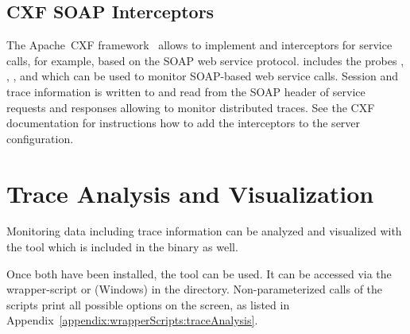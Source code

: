 \subsection{CXF SOAP Interceptors}\label{sec:traceAnalysis:instr:cxf}

The Apache~CXF framework~\cite{CXF-WebSite} allows to implement and interceptors for service calls, %
for example, based on the SOAP web service protocol. %
\Kieker{} includes the probes %
, %
, %
, and %
 which can be used to %
monitor SOAP-based web service calls. %
Session and trace information is written to and read from the SOAP header of %
service requests and responses allowing to monitor distributed traces. %
See the CXF documentation for instructions how to add the interceptors %
to the server configuration.

\pagebreak

\section{Trace Analysis and Visualization}\label{sec:traceAnalysisTool}


Monitoring data including trace information can be analyzed and visualized with the \KiekerTraceAnalysis{} tool which is included in the \Kieker{} binary as well.\\

 \vspace{3mm}

\noindent Once both have been installed, the \KiekerTraceAnalysis{} tool can be used. It can be accessed via the wrapper-script  or  (Windows) in the  directory. Non-parameterized calls of the scripts print all possible options on the screen, as listed in Appendix~\ref{appendix:wrapperScripts:traceAnalysis}.

